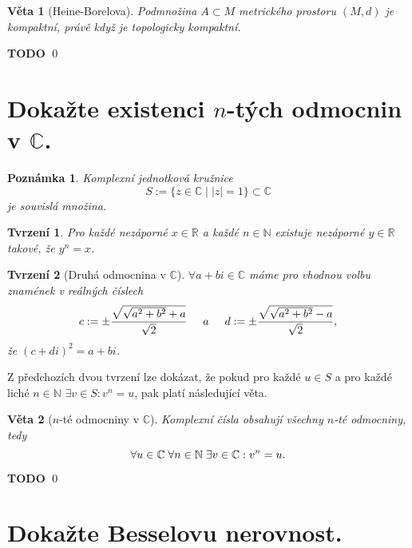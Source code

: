 \documentclass[11pt]{article}
\theoremstyle{nontheoremstyle}
\renewenvironment{proof}{{\noindent\bfseries Důkaz:}}{\qed}
\newtheorem*{remark}{Poznámka}
\theoremstyle{nontheoremstylenodot}
\theoremstyle{theoremstyle}
\newtheorem*{theorem}{Věta}
\newtheorem*{lemma}{Tvrzení}
\begin{document}
\begin{theorem}[Heine-Borelova]
    Podmnožina $A\subset M$ metrického prostoru $(M,d)$ je kompaktní, právě když je topologicky kompaktní.
\end{theorem}
\begin{proof}
    \LARGE
    \textbf{TODO}
\end{proof}

\section{Dokažte existenci $n$-tých odmocnin v $\mathbb{C}$.}

\begin{remark}
    Komplexní jednotková kružnice \[ S := \{ z \in \mathbb{C} \mid |z| = 1 \} \subset \mathbb{C} \]
    je souvislá množina.
\end{remark}

\begin{lemma}
    Pro každé nezáporné $x \in \mathbb{R}$ a každé $n \in \mathbb{N}$ existuje nezáporné $y\in \mathbb{R}$ takové, že $y^n = x$.
\end{lemma}

\begin{lemma}[Druhá odmocnina v $\mathbb{C}$]
    $\forall a+bi \in \mathbb{C}$ máme pro vhodnou volbu znamének v reálných číslech
    \[ c := \pm \frac{\sqrt{\sqrt{a^2 + b^2} + a}}{\sqrt{2}} \hspace{5mm} a \hspace{5mm} d := \pm \frac{\sqrt{\sqrt{a^2 + b^2} - a}}{\sqrt{2}}, \]
    že $(c+di)^2 = a+bi$.
\end{lemma}

Z předchozích dvou tvrzení lze dokázat, že pokud pro každé $u \in S$ a pro každé liché $ n \in\mathbb{N}$ $\exists v \in S: v^n = u$, pak
platí následující věta.

\begin{theorem}[$n$-té odmocniny v $\mathbb{C}$]
    Komplexní čísla obsahují všechny $n$-té odmocniny, tedy
    \[ \forall u \in \mathbb{C} \hspace{1mm} \forall n \in \mathbb{N} \hspace{1mm} \exists v \in \mathbb{C}: v^n = u. \]
\end{theorem}
\begin{proof}
    \LARGE
    \textbf{TODO}
\end{proof}

\section{Dokažte Besselovu nerovnost.}
\end{document}
